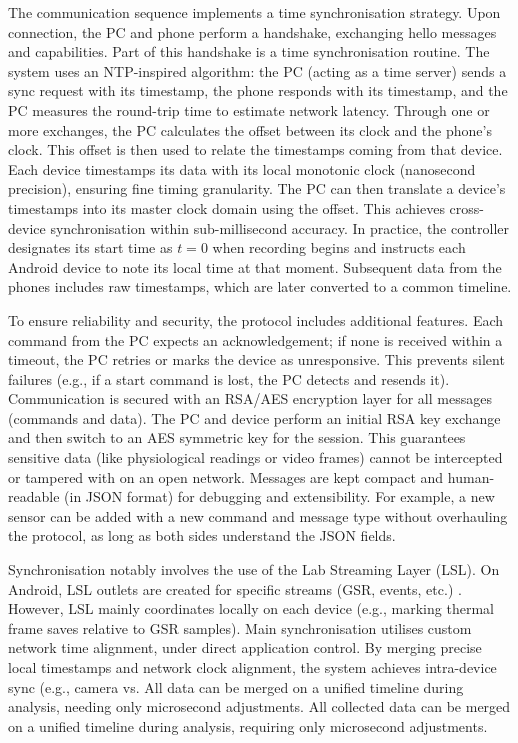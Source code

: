 The communication sequence implements a time synchronisation strategy. Upon connection, the PC and phone perform a handshake, exchanging hello messages and capabilities. Part of this handshake is a time synchronisation routine. The system uses an NTP-inspired algorithm: the PC (acting as a time server) sends a sync request with its timestamp, the phone responds with its timestamp, and the PC measures the round-trip time to estimate network latency. Through one or more exchanges, the PC calculates the offset between its clock and the phone's clock. This offset is then used to relate the timestamps coming from that device. Each device timestamps its data with its local monotonic clock (nanosecond precision), ensuring fine timing granularity. The PC can then translate a device’s timestamps into its master clock domain using the offset. This achieves cross-device synchronisation within sub-millisecond accuracy. In practice, the controller designates its start time as $t = 0$ when recording begins and instructs each Android device to note its local time at that moment. Subsequent data from the phones includes raw timestamps, which are later converted to a common timeline.

To ensure reliability and security, the protocol includes additional features. Each command from the PC expects an acknowledgement; if none is received within a timeout, the PC retries or marks the device as unresponsive. This prevents silent failures (e.g., if a start command is lost, the PC detects and resends it). Communication is secured with an RSA/AES encryption layer for all messages (commands and data). The PC and device perform an initial RSA key exchange and then switch to an AES symmetric key for the session. This guarantees sensitive data (like physiological readings or video frames) cannot be intercepted or tampered with on an open network. Messages are kept compact and human-readable (in JSON format) for debugging and extensibility. For example, a new sensor can be added with a new command and message type without overhauling the protocol, as long as both sides understand the JSON fields.

Synchronisation notably involves the use of the Lab Streaming Layer (LSL). On Android, LSL outlets are created for specific streams (GSR, events, etc.) \cite{ref9}. However, LSL mainly coordinates locally on each device (e.g., marking thermal frame saves relative to GSR samples). Main synchronisation utilises custom network time alignment, under direct application control. By merging precise local timestamps and network clock alignment, the system achieves intra-device sync (e.g., camera vs. All data can be merged on a unified timeline during analysis, needing only microsecond adjustments. All collected data can be merged on a unified timeline during analysis, requiring only microsecond adjustments.

